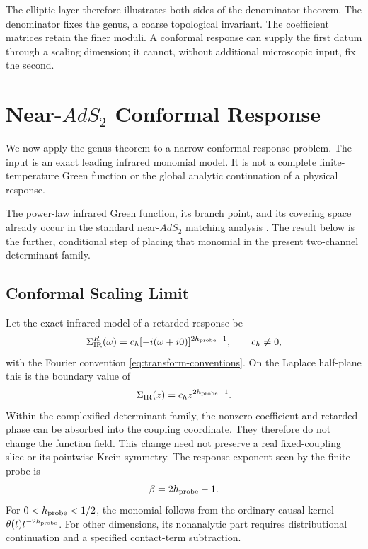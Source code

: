 \documentclass[11pt,reqno]{amsart}
\theoremstyle{remark}
\begin{document}
The elliptic layer therefore illustrates both sides of the denominator
theorem.  The denominator fixes the genus, a coarse topological invariant.
The coefficient matrices retain the finer moduli.  A conformal response can
supply the first datum through a scaling dimension; it cannot, without additional
microscopic input, fix the second.

\section{Near-\texorpdfstring{$AdS_2$}{AdS2} Conformal Response}\label{sec:ads2}

We now apply the genus theorem to a narrow conformal-response problem.  The
input is an exact leading infrared monomial model.  It is not a complete
finite-temperature Green function or the global analytic continuation of a
physical response.

The power-law infrared Green function, its branch point, and its covering
space already occur in the standard near-$AdS_2$ matching analysis
\cite{FaulknerEtAl2011}.  The result below is the further, conditional step of
placing that monomial in the present two-channel determinant family.

\subsection{Conformal Scaling Limit}

Let the exact infrared model of a retarded response be
\begin{equation}\label{eq:conformal-response}
 \Sigma_{\rm IR}^R(\omega)
 =c_h[-i(\omega+i0)]^{2h_{\rm probe}-1},
 \qquad c_h\ne0,
\end{equation}
with the Fourier convention \eqref{eq:transform-conventions}.  On the
Laplace half-plane this is the boundary value of
\begin{equation}\label{eq:conformal-laplace-model}
 \Sigma_{\rm IR}(z)=c_hz^{2h_{\rm probe}-1}.
\end{equation}
Within the complexified determinant family, the nonzero coefficient and
retarded phase can be absorbed into the coupling coordinate.  They therefore
do not change the function field.  This change need not preserve a real
fixed-coupling slice or its pointwise Krein symmetry.  The response exponent
seen by the finite probe is
\begin{equation}\label{eq:beta-h}
 \beta=2h_{\rm probe}-1.
\end{equation}
For $0<h_{\rm probe}<1/2$, the monomial follows from the ordinary causal
kernel $\theta(t)t^{-2h_{\rm probe}}$.  For other dimensions, its
nonanalytic part requires distributional continuation and a specified
contact-term subtraction.
\end{document}
